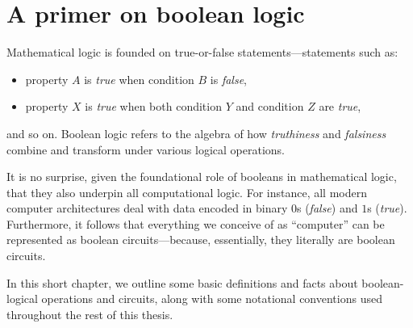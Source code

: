 \chapter{A primer on boolean logic}
\label{ch:boolean}

Mathematical logic is founded on true-or-false statements---statements such as:
\begin{itemize}[nosep]
  \item property \(A\) is \emph{true} when condition \(B\) is \emph{false},
  \item property \(X\) is \emph{true} when both condition \(Y\) and condition
    \(Z\) are \emph{true},
\end{itemize}
and so on.  Boolean logic refers to the algebra of how \emph{truthiness} and
\emph{falsiness} combine and transform under various logical operations.

It is no surprise, given the foundational role of booleans in mathematical
logic, that they also underpin all computational logic. For instance, all
modern computer architectures deal with data encoded in binary \(0\)s
(\emph{false}) and \(1\)s (\emph{true}).  Furthermore, it follows that
everything we conceive of as ``computer'' can be represented as boolean
circuits---because, essentially, they literally are boolean circuits.


In this short chapter, we outline some basic definitions and facts about
boolean-logical operations and circuits, along with some notational conventions
used throughout the rest of this thesis.

